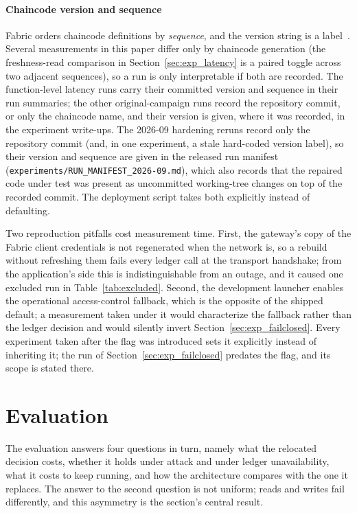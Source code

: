 \documentclass[preprint,12pt]{elsarticle}
\begin{document}
\paragraph{Chaincode version and sequence}
Fabric orders chaincode definitions by \emph{sequence}, and the version string
is a label~\cite{fabricChaincodeLifecycleDoc}. Several measurements in this paper differ only by chaincode
generation (the freshness-read comparison in
Section~\ref{sec:exp_latency} is a paired toggle across two adjacent
sequences), so a run is only interpretable if both are recorded. The
function-level latency runs carry their committed version and sequence in
their run summaries; the other original-campaign runs record the repository
commit, or only the chaincode name, and their version is given, where it was
recorded, in the experiment write-ups. The 2026-09 hardening reruns record only the repository
commit (and, in one experiment, a stale hard-coded version label), so their
version and sequence are given in the released run manifest
(\texttt{experiments/RUN\_MANIFEST\_2026-09.md}), which also records that the
repaired code under test was present as uncommitted working-tree changes on
top of the recorded commit. The deployment script takes both explicitly
instead of defaulting.

Two reproduction pitfalls cost measurement time. First, the gateway's copy of the Fabric client credentials is not
regenerated when the network is, so a rebuild without refreshing them fails
every ledger call at the transport handshake; from the application's side this
is indistinguishable from an outage, and it caused one excluded run in
Table~\ref{tab:excluded}. Second, the development launcher enables the
operational access-control fallback, which is the opposite of the shipped
default; a measurement taken under it would characterize the fallback rather
than the ledger decision and would silently invert
Section~\ref{sec:exp_failclosed}. Every experiment taken after the flag was introduced sets it explicitly
instead of inheriting it; the run of Section~\ref{sec:exp_failclosed}
predates the flag, and its scope is stated there.


\section{Evaluation}
\label{sec:performance}


The evaluation answers four questions in turn, namely what the relocated
decision costs, whether it holds under attack and under ledger unavailability,
what it costs to keep running, and how the architecture compares with the one
it replaces. The answer to the second question is not uniform; reads and writes
fail differently, and this asymmetry is the section's central result.
\end{document}
